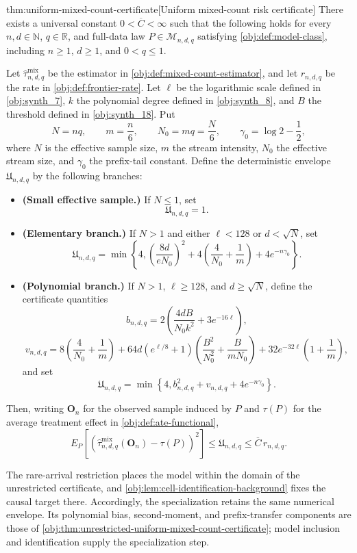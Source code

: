 \begin{theoremv}{thm:uniform-mixed-count-certificate}[Uniform mixed-count risk certificate]
There exists a universal constant \(0<\overline C<\infty\) such that the following holds for every \(n,d\in\mathbb N\), \(q\in\mathbb R\), and full-data law \(P\in\mathcal M_{n,d,q}\) satisfying \cref{obj:def:model-class}, including \(n\ge1\), \(d\ge1\), and \(0<q\le1\).

Let \(\widehat\tau^{\mathrm{mix}}_{n,d,q}\) be the estimator in \cref{obj:def:mixed-count-estimator}, and let \(r_{n,d,q}\) be the rate in \cref{obj:def:frontier-rate}. Let \(\ell\) be the logarithmic scale defined in \cref{obj:synth_7}, \(k\) the polynomial degree defined in \cref{obj:synth_8}, and \(B\) the threshold defined in \cref{obj:synth_18}. Put
\[
N=nq,\qquad m=\frac n6,\qquad N_0=mq=\frac N6,\qquad
\gamma_0=\log 2-\frac12,
\]
where \(N\) is the effective sample size, \(m\) the stream intensity, \(N_0\) the effective stream size, and \(\gamma_0\) the prefix-tail constant. Define the deterministic envelope \(\mathfrak U_{n,d,q}\) by the following branches:
\begin{itemize}
\item \textbf{(Small effective sample.)} If \(N\le1\), set
\[
\mathfrak U_{n,d,q}=1.
\]
\item \textbf{(Elementary branch.)} If \(N>1\) and either \(\ell<128\) or \(d<\sqrt N\), set
\[
\mathfrak U_{n,d,q}
=\min\left\{4,
\left(\frac{8d}{eN_0}\right)^2
+4\left(\frac4{N_0}+\frac1m\right)
+4e^{-n\gamma_0}\right\}.
\]
\item \textbf{(Polynomial branch.)} If \(N>1\), \(\ell\ge128\), and \(d\ge\sqrt N\), define the certificate quantities
\[
b_{n,d,q}
=2\left(\frac{4dB}{N_0k^2}+3e^{-16\ell}\right),
\]
\[
v_{n,d,q}
=8\left(\frac4{N_0}+\frac1m\right)
+64d\left(e^{\ell/8}+1\right)
\left(\frac{B^2}{N_0^2}+\frac{B}{mN_0}\right)
+32e^{-32\ell}\left(1+\frac1m\right),
\]
and set
\[
\mathfrak U_{n,d,q}
=\min\left\{4,b_{n,d,q}^2+v_{n,d,q}+4e^{-n\gamma_0}\right\}.
\]
\end{itemize}
Then, writing \(\mathbf O_n\) for the observed sample induced by \(P\) and \(\tau(P)\) for the average treatment effect in \cref{obj:def:ate-functional},
\[
E_P\!\left[
\left(\widehat\tau^{\mathrm{mix}}_{n,d,q}(\mathbf O_n)-\tau(P)\right)^2
\right]
\le \mathfrak U_{n,d,q}
\le \overline C\,r_{n,d,q}.
\]
\end{theoremv}

The rare-arrival restriction places the model within the domain of the unrestricted certificate, and \cref{obj:lem:cell-identification-background} fixes the causal target there. Accordingly, the specialization retains the same numerical envelope. Its polynomial bias, second-moment, and prefix-transfer components are those of \cref{obj:thm:unrestricted-uniform-mixed-count-certificate}; model inclusion and identification supply the specialization step.

